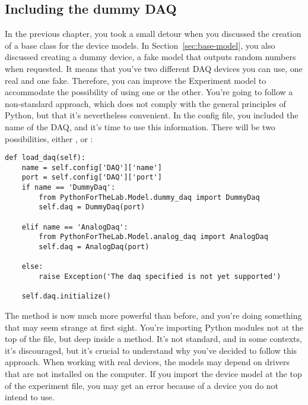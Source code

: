 
\subsection{Including the dummy DAQ}\label{subsec:loading-dummy-daq}
In the previous chapter, you took a small detour when you discussed the creation of a base class for the device models. In Section~\ref{sec:base-model}, you also discussed creating a dummy device, a fake model that outputs random numbers when requested. It means that you've two different DAQ devices you can use, one real and one fake. Therefore, you can improve the Experiment model to accommodate the possibility of using one or the other. You're going to follow a non-standard approach, which does not comply with the general principles of Python, but that it's nevertheless convenient. In the config file, you included the name of the DAQ, and it's time to use this information. There will be two possibilities, either , or :

\begin{verbatim}
def load_daq(self):
    name = self.config['DAQ']['name']
    port = self.config['DAQ']['port']
    if name == 'DummyDaq':
        from PythonForTheLab.Model.dummy_daq import DummyDaq
        self.daq = DummyDaq(port)

    elif name == 'AnalogDaq':
        from PythonForTheLab.Model.analog_daq import AnalogDaq
        self.daq = AnalogDaq(port)

    else:
        raise Exception('The daq specified is not yet supported')

    self.daq.initialize()
\end{verbatim}

The  method is now much more powerful than before, and you're doing something that may seem strange at first sight. You're importing Python modules not at the top of the file, but deep inside a method. It's not standard, and in some contexts, it's discouraged, but it's crucial to understand why you've decided to follow this approach. When working with real devices, the models may depend on drivers that are not installed on the computer. If you import the device model at the top of the experiment file, you may get an error because of a device you do not intend to use.

